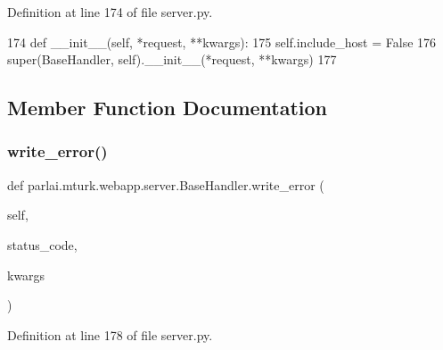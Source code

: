 Definition at line 174 of file server.\+py.


\begin{DoxyCode}
174     \textcolor{keyword}{def }\_\_init\_\_(self, *request, **kwargs):
175         self.include\_host = \textcolor{keyword}{False}
176         super(BaseHandler, self).\_\_init\_\_(*request, **kwargs)
177 
\end{DoxyCode}


\subsection{Member Function Documentation}
\mbox{\label{classparlai_1_1mturk_1_1webapp_1_1server_1_1BaseHandler_a5598d255e3912452fbfcab561819840e}} 
\subsubsection{\texorpdfstring{write\+\_\+error()}{write\_error()}}
{\footnotesize\ttfamily def parlai.\+mturk.\+webapp.\+server.\+Base\+Handler.\+write\+\_\+error (\begin{DoxyParamCaption}\item[{}]{self,  }\item[{}]{status\+\_\+code,  }\item[{}]{kwargs }\end{DoxyParamCaption})}



Definition at line 178 of file server.\+py.


